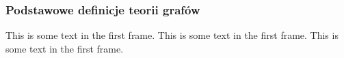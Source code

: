\begin{frame}
    \frametitle{Podstawowe definicje teorii grafów}
    This is some text in the first frame. This is some text in the first frame. This is some text in the first frame.
\end{frame}